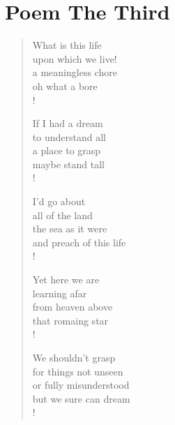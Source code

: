 \section{Poem The Third}

\settowidth{\versewidth}{Than Tycho Brahe, or Erra Pater:}
\begin{verse}
What is this life\\
upon which we live!\\
a meaningless chore\\
oh what a bore\\!

If I had a dream\\
to understand all\\
a place to grasp\\
maybe stand tall\\!

I'd go about\\
all of the land\\
the sea as it were\\
and preach of this life\\!

Yet here we are\\
learning afar\\
from heaven above\\
that romaing star\\!

We shouldn't grasp\\
for things not unseen\\
or fully misunderstood\\
but we sure can dream\\!
\end{verse}
